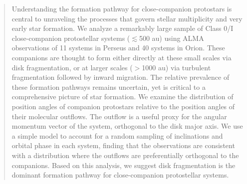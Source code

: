 \documentclass[linenumbers,twocolumn, twocolappendix]{aastex631}
\begin{document}

\begin{abstract}
Understanding the formation pathway for close-companion protostars is central to unraveling the processes that govern stellar multiplicity and very early star formation. We analyze a remarkably large sample of Class 0/I close-companion protostellar systems ($\lesssim$500 au) using ALMA observations of 11 systems in Perseus and 40 systems in Orion. These companions are thought to form either directly at these small scales via disk fragmentation, or at larger scales ($>$1000 au) via turbulent fragmentation followed by inward migration. The relative prevalence of these formation pathways remains uncertain, yet is critical to a comprehensive picture of star formation. We examine the distribution of position angles of companion protostars relative to the position angles of their molecular outflows. The outflow is a useful proxy for the angular momentum vector of the system, orthogonal to the disk major axis. We use a simple model to account for a random sampling of inclinations and orbital phase in each system, finding that the observations are consistent with a distribution where the outflows are preferentially orthogonal to the companions. Based on this analysis, we suggest disk fragmentation is the dominant formation pathway for close-companion protostellar systems.
\end{abstract}

\end{document}
